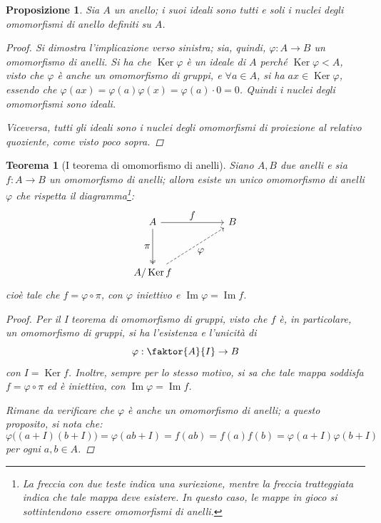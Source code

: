 \documentclass[11pt]{scrartcl}
\theoremstyle{style1}
\newtheorem{teorema}{Teorema}[section]
\newtheorem{prop}{Proposizione}[section]
\numberwithin{equation}{subsection}
\begin{document}
\begin{prop}
	Sia $A$ un anello; i suoi ideali sono tutti e soli i nuclei degli omomorfismi di anello definiti su $A$.
	\begin{proof}
		Si dimostra l'implicazione verso sinistra; sia, quindi, $\varphi  : A \to B$ un omomorfismo di anelli.
		Si ha che $\operatorname{Ker} \varphi $ \`e un ideale di $A$ perch\'e $\operatorname{Ker} \varphi <  A$, visto che $\varphi $ \`e anche un omomorfismo di gruppi, e $\forall a \in A$, si ha $ax \in \operatorname{Ker} \varphi $, essendo che $\varphi (ax) = \varphi (a) \varphi (x) = \varphi (a) \cdot 0 = 0$.
		Quindi i nuclei degli omomorfismi sono ideali.

		Viceversa, tutti gli ideali sono i nuclei degli omomorfismi di proiezione al relativo quoziente, come visto poco sopra.
	\end{proof}
\end{prop}
\begin{teorema}
	[I teorema di omomorfismo di anelli]
	Siano $A,B$ due anelli e sia $f: A \to B$ un omomorfismo di anelli; allora esiste un unico omomorfismo di anelli $\varphi $ che rispetta il diagramma\footnote{La freccia con due teste indica una suriezione, mentre la freccia tratteggiata indica che tale mappa deve esistere. In questo caso, le mappe in gioco si sottintendono essere omomorfismi di anelli.}:
\[
\begin{tikzcd}
	A & & B\\
	\\
	A / \operatorname{Ker} f
	\arrow[from=1-1,to=1-3,"\displaystyle f"]
	\arrow[from=1-1,to=3-1,"\displaystyle \pi"',two heads]
	\arrow[from=3-1,to=1-3,"\displaystyle \varphi "',dashed]
\end{tikzcd}
\] 
	cio\`e tale che $f = \varphi \circ \pi$, con $\varphi $ iniettivo e $\operatorname{Im} \varphi  = \operatorname{Im} f$.
	\begin{proof}
		Per il I teorema di omomorfismo di gruppi, visto che $f$ \`e, in particolare, un omomorfismo di gruppi, si ha l'esistenza e l'unicit\`a di 
		\[
		\varphi  : \faktor{A}{I} \to B
		\] 
		con $I = \operatorname{Ker} f$.
		Inoltre, sempre per lo stesso motivo, si sa che tale mappa soddisfa $f = \varphi  \circ \pi$ ed \`e iniettiva, con $\operatorname{Im} \varphi = \operatorname{Im} f$.
		
		Rimane da verificare che $\varphi $ \`e anche un omomorfismo di anelli; a questo proposito, si nota che:
		\[
			\varphi \big((a+I)(b+I)\big)=\varphi (ab + I) = f(ab) =f(a)f(b) = \varphi (a+I) \varphi (b+I)
		\] 
		per ogni $a,b \in A$.
	\end{proof}
\end{teorema}
\end{document}
